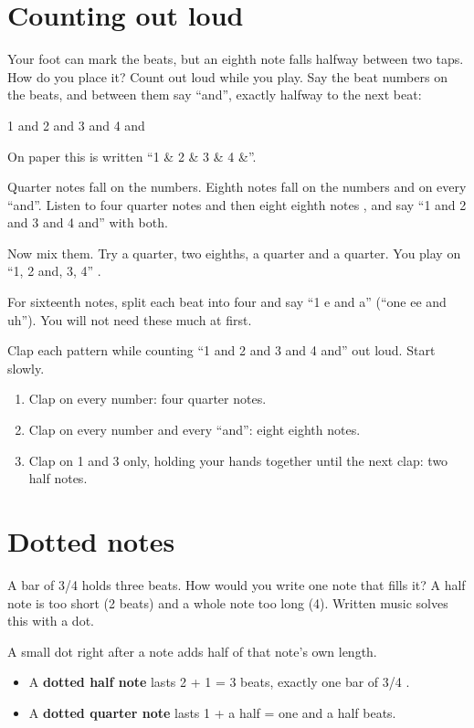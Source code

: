 \section{Counting out loud}

Your foot can mark the beats, but an eighth note falls halfway between two taps. How do you place it? Count out loud while you play. Say the beat numbers on the beats, and between them say ``and'', exactly halfway to the next beat:
\begin{center}
1 and 2 and 3 and 4 and
\end{center}
On paper this is written ``1 \& 2 \& 3 \& 4 \&''.

Quarter notes fall on the numbers. Eighth notes fall on the numbers and on every ``and''. Listen to four quarter notes  and then eight eighth notes , and say ``1 and 2 and 3 and 4 and'' with both.

Now mix them. Try a quarter, two eighths, a quarter and a quarter. You play on ``1, 2 and, 3, 4'' .

For sixteenth notes, split each beat into four and say ``1 e and a'' (``one ee and uh''). You will not need these much at first.

\begin{tryitbox}
Clap each pattern while counting ``1 and 2 and 3 and 4 and'' out loud. Start slowly.
\begin{enumerate}
  \item Clap on every number: four quarter notes.
  \item Clap on every number and every ``and'': eight eighth notes.
  \item Clap on 1 and 3 only, holding your hands together until the next clap: two half notes.
\end{enumerate}
\end{tryitbox}

\section{Dotted notes}

A bar of 3/4 holds three beats. How would you write one note that fills it? A half note is too short (2 beats) and a whole note too long (4). Written music solves this with a dot.

A small dot right after a note adds half of that note's own length.
\begin{itemize}
  \item A \textbf{dotted half note} lasts 2 + 1 = 3 beats, exactly one bar of 3/4 .
  \item A \textbf{dotted quarter note} lasts 1 + a half = one and a half beats.
\end{itemize}

